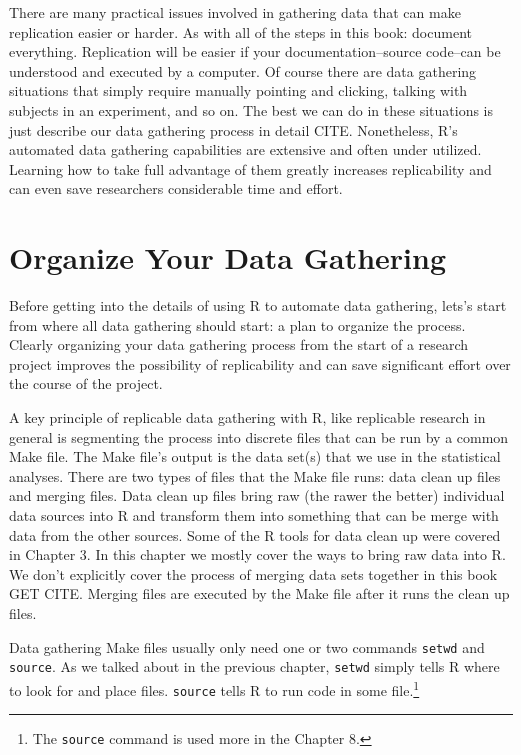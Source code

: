 \documentclass[ChapterTOCs,krantz1]{krantz}\usepackage{graphicx, color}
\begin{document}
There are many practical issues involved in gathering data that can make replication easier or harder. As with all of the steps in this book: document everything. Replication will be easier if your documentation--source code--can be understood and executed by a computer. Of course there are data gathering situations that simply require manually pointing and clicking, talking with subjects in an experiment, and so on. The best we can do in these situations is just describe our data gathering process in detail CITE. Nonetheless, R's automated data gathering capabilities are extensive and often under utilized. Learning how to take full advantage of them greatly increases replicability and can even save researchers considerable time and effort.

\section{Organize Your Data Gathering}

Before getting into the details of using R to automate data gathering, lets's start from where all data gathering should start: a plan to organize the process. Clearly organizing your data gathering process from the start of a research project improves the possibility of replicability and can save significant effort over the course of the project. 

A key principle of replicable data gathering with R, like replicable research in general is segmenting the process into discrete files that can be run by a common Make file. The Make file's output is the data set(s) that we use in the statistical analyses. There are two types of files that the Make file runs: data clean up files and merging files. Data clean up files bring raw (the rawer the better) individual data sources into R and transform them into something that can be merge with data from the other sources. Some of the R tools for data clean up were covered in Chapter 3. In this chapter we mostly cover the ways to bring raw data into R. We don't explicitly cover the process of merging data sets together in this book GET CITE. Merging files are executed by the Make file after it runs the clean up files.

Data gathering Make files usually only need one or two commands {\tt{setwd}} and {\tt{source}}. As we talked about in the previous chapter, {\tt{setwd}} simply tells R where to look for and place files. {\tt{source}} tells R to run code in some file.\footnote{The {\tt{source}} command is used more in the Chapter 8.} 
\end{document}
